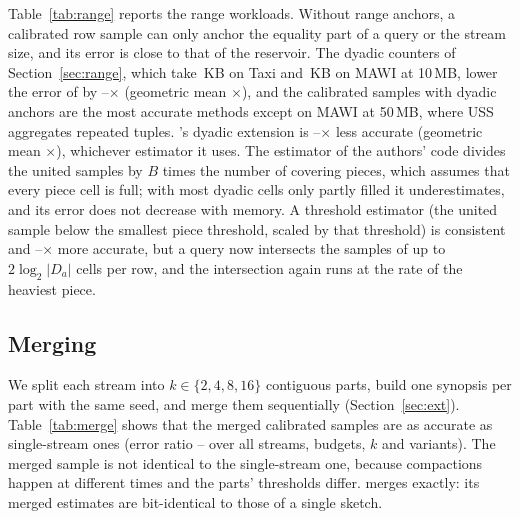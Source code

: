 Table~\ref{tab:range} reports the range workloads. Without range anchors, a calibrated row sample can only
anchor the equality part of a query or the stream size, and its error is close to that of the reservoir.
The dyadic counters of Section~\ref{sec:range}, which take \NumRangeDyKbTaxi\,KB on Taxi and
\NumRangeDyKbMawi\,KB on MAWI at 10\,MB, lower the error of \cs by \NumRangeDyGainLo--\NumRangeDyGainHi$\times$
(geometric mean \NumRangeDyGainGm$\times$), and the calibrated samples with dyadic anchors are the most
accurate methods except on MAWI at 50\,MB, where USS aggregates repeated tuples. \omni's dyadic extension
is \NumRangeBestVsOmniLo--\NumRangeBestVsOmniHi$\times$ less accurate (geometric mean
\NumRangeBestVsOmniGm$\times$), whichever estimator it uses. The estimator of the authors' code divides
the united samples by $B$ times the number of covering pieces, which assumes that every piece cell is
full; with most dyadic cells only partly filled it underestimates, and its error does not decrease with
memory. A threshold estimator (the united sample below the smallest piece threshold, scaled by that
threshold) is consistent and \NumRangeOmniThrVsCodeLo--\NumRangeOmniThrVsCodeHi$\times$ more accurate,
but a query now intersects the samples of up to $2\log_2|D_a|$ cells per row, and the intersection again
runs at the rate of the heaviest piece.

\subsection{Merging}\label{sec:mergeres}

\begin{table}[t]
\centering\small\setlength{\tabcolsep}{4pt}
\caption{Error after merging synopses built on $k$ contiguous parts, relative to one synopsis built on
the whole stream (geometric mean over Taxi, MAWI and Zipf with $\alpha=1.3$, 5 seeds).}
\label{tab:merge}

\end{table}

We split each stream into $k\in\{2,4,8,16\}$ contiguous parts, build one synopsis per part with the same
seed, and merge them sequentially (Section~\ref{sec:ext}). Table~\ref{tab:merge} shows that the merged
calibrated samples are as accurate as single-stream ones (error ratio \NumMergeCsLo--\NumMergeCsHi{} over
all streams, budgets, $k$ and variants). The merged sample is not identical to the single-stream one,
because compactions happen at different times and the parts' thresholds differ. \omni
merges exactly: its merged estimates are bit-identical to those of a single sketch.

